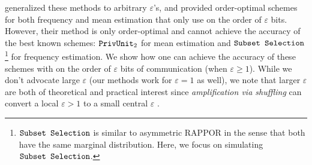 \cite{CKO20} generalized these methods to arbitrary $\varepsilon$'s, and provided order-optimal schemes for both frequency and mean estimation that only use on the order of $\varepsilon$ bits. However, their method is only order-optimal and cannot achieve the accuracy of the best known schemes: $\texttt{PrivUnit}_2$ \citep{BDFKR2018} for mean estimation and $\texttt{Subset Selection}$ \citep{YB18}\footnote{$\texttt{Subset Selection}$ is similar to asymmetric RAPPOR \citep{erlingsson14rappor} in the sense that both have the same marginal distribution. Here, we focus on simulating $\texttt{Subset Selection}$.} 
for frequency estimation. We show how one can achieve the accuracy of these schemes with on the order of $\varepsilon$ bits of communication (when $\varepsilon \geq 1$). While we don't advocate large $\varepsilon$ (our methods work for $\varepsilon=1$ as well), we note that larger $\varepsilon$ are both of theoretical and practical interest 
since \textit{amplification via shuffling} can convert a local $\varepsilon > 1$ to a small central $\varepsilon$ \citep{erlingsson2019amplification,balle2019privacy, erlingsson2020encode}.

